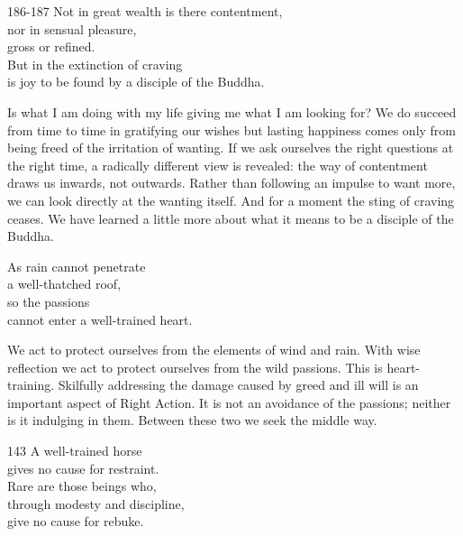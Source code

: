 
\begin{dhpVerse}{186-187}
\label{dhp-186}\label{dhp-187}
Not in great wealth is there contentment,\\
nor in sensual pleasure,\\
gross or refined.\\
But in the extinction of craving\\
is joy to be found by a disciple of the Buddha.
\end{dhpVerse}

\begin{dhpRefl}

Is what I am doing with my life giving me what I am looking for? We
do succeed from time to time in gratifying our wishes but lasting
happiness comes only from being freed of the irritation of wanting.
If we ask ourselves the right questions at the right time, a
radically different view is revealed: the way of contentment draws us
inwards, not outwards. Rather than following an impulse to want more,
we can look directly at the wanting itself. And for a moment the
sting of craving ceases. We have learned a little more about what it
means to be a disciple of the Buddha.

\end{dhpRefl}


\begin{dhpVerse}{14}
\label{dhp-14}
As rain cannot penetrate\\
a well-thatched roof,\\
so the passions\\
cannot enter a well-trained heart.
\end{dhpVerse}

\begin{dhpRefl}

We act to protect ourselves from the elements of wind and rain. With
wise reflection we act to protect ourselves from the wild passions.
This is heart-training. Skilfully addressing the damage caused by
greed and ill will is an important aspect of Right Action. It is not
an avoidance of the passions; neither is it indulging in them.
Between these two we seek the middle way.

\end{dhpRefl}


\begin{dhpVerse}{143}
\label{dhp-143}
A well-trained horse\\
gives no cause for restraint.\\
Rare are those beings who,\\
through modesty and discipline,\\
give no cause for rebuke.
\end{dhpVerse}

